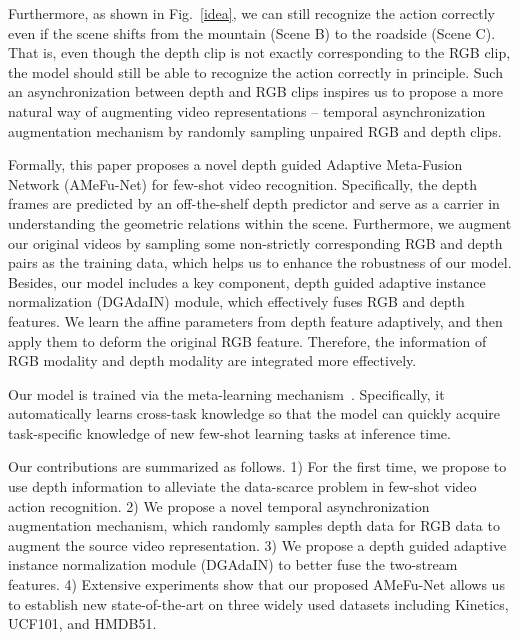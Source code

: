 \documentclass[sigconf]{acmart}
\begin{document}
	Furthermore, as shown in Fig.~\ref{idea}, we can still recognize the action correctly even if the scene shifts from the mountain (Scene B) to the roadside (Scene C).  
	That is, even though the depth clip is not exactly corresponding to the RGB clip, the model should still be able to recognize the action correctly in principle. 
	Such an asynchronization between depth and RGB clips inspires us to propose a more natural way of augmenting video representations -- temporal asynchronization augmentation mechanism by randomly sampling unpaired RGB and depth clips.
	
	Formally, this paper proposes a novel depth guided Adaptive Meta-Fusion Network (AMeFu-Net) for few-shot video recognition. Specifically, the depth frames are predicted by an off-the-shelf depth predictor \cite{godard2019digging} and serve as a carrier in understanding the geometric relations within the scene. Furthermore, we augment our original videos by sampling some non-strictly corresponding RGB and depth pairs as the training data, which helps us to enhance the robustness of our model. Besides, our model includes a key component, depth guided adaptive instance normalization (DGAdaIN) module, which effectively fuses RGB and depth features. We learn the affine parameters from depth feature adaptively, and then apply them to deform the original RGB feature. Therefore, the information of RGB modality and depth modality are integrated more effectively.
	
	Our model is trained via the meta-learning mechanism~\cite{matchingnet_1shot}. Specifically, it automatically learns cross-task knowledge so that the model can quickly acquire task-specific knowledge of new few-shot learning tasks at inference time. 

	Our contributions are summarized as follows. 
	1) For the first time, we propose to use depth information to alleviate the data-scarce problem in few-shot video action recognition.
	2) We propose a novel temporal asynchronization augmentation mechanism, which randomly samples depth data for RGB data to augment the source video representation.
	3) We propose a depth guided adaptive instance normalization module (DGAdaIN) to better fuse the two-stream features. 
	4) Extensive experiments show that our proposed AMeFu-Net allows us to establish new state-of-the-art on three widely used datasets including Kinetics, UCF101, and HMDB51.
	
	
	
	
	
	
	
\end{document}
